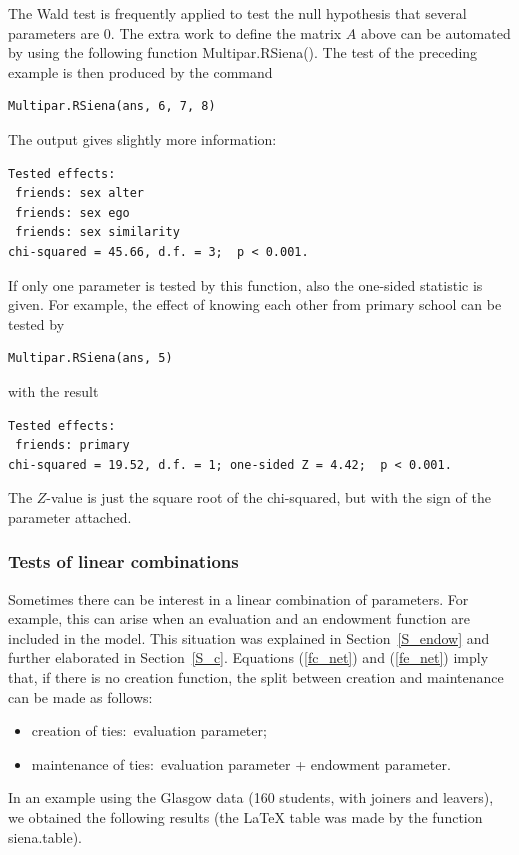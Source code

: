 \documentclass[a4paper,fleqn,11pt]{article}
\newcommand{\+}{\, + \,}
\newcommand{\sfn}[1]{\textsf{#1}}
\begin{document}
The Wald test is frequently applied to test the null
hypothesis that several parameters are 0.
The extra work to define the matrix $A$ above can be automated
by using the following function \sfn{Multipar.RSiena()}.
The test of the preceding example is then produced by the command
\begin{verbatim}
Multipar.RSiena(ans, 6, 7, 8)
\end{verbatim}
The output gives slightly more information:
\begin{verbatim}
Tested effects:
 friends: sex alter
 friends: sex ego
 friends: sex similarity
chi-squared = 45.66, d.f. = 3;  p < 0.001.
\end{verbatim}
If only one parameter is tested by this function, also the
one-sided statistic is given. For example, the effect
of knowing each other from primary school can be tested by
\begin{verbatim}
Multipar.RSiena(ans, 5)
\end{verbatim}
with the result
\begin{verbatim}
Tested effects:
 friends: primary
chi-squared = 19.52, d.f. = 1; one-sided Z = 4.42;  p < 0.001.
\end{verbatim}
The $Z$-value is just the square root of the chi-squared,
but with the sign of the parameter attached.


\subsubsection{Tests of linear combinations}

Sometimes there can be interest in a linear combination of parameters.
For example, this can arise when an evaluation and an endowment function
are included in the model.
This situation was explained in Section~\ref{S_endow} and
further elaborated in Section~\ref{S_c}.
Equations (\ref{fc_net}) and (\ref{fe_net}) imply that,
if there is no creation function,
the split between creation and maintenance can be made as follows:
\begin{itemize}
\item creation of ties:\  evaluation parameter;
\item maintenance of ties:\ evaluation parameter + endowment parameter.
\end{itemize}

In an example using the Glasgow data (160 students, with joiners and leavers),
we obtained the following results (the LaTeX table was made by the function
\textsf{siena.table}).
\end{document}
